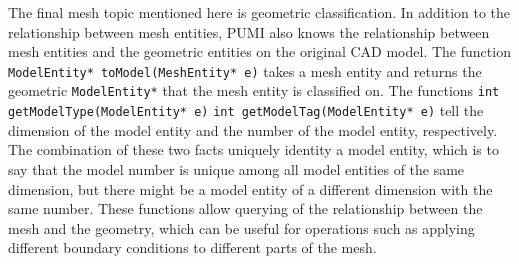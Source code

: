\documentclass[12pt]{article}
\newcommand{\ttt}{\texttt}
\begin{document}
The final mesh topic mentioned here is geometric classification.  In addition to the relationship between mesh entities, PUMI also knows the relationship between mesh entities and the geometric entities on the original CAD model.  The function
\newline
\newline
\noindent \ttt{ModelEntity* toModel(MeshEntity* e)}
\newline
\newline
\noindent takes a mesh entity and returns the geometric \ttt{ModelEntity*} that the mesh entity is classified on.  The functions
\newline
\newline
\noindent\ttt{int getModelType(ModelEntity* e)}
\newline
\noindent\ttt{int getModelTag(ModelEntity* e)}
\newline
\newline
tell the dimension of the model entity and the number of the model entity, respectively.
The combination of these two facts uniquely identity a model entity, which is to say that the model number is unique among all model entities of the same dimension, but there might be a model entity of a different dimension with the same number.  
These functions allow querying of the relationship between the mesh and the geometry, which can be useful for operations such as applying different boundary conditions to different parts of the mesh.
\end{document}
